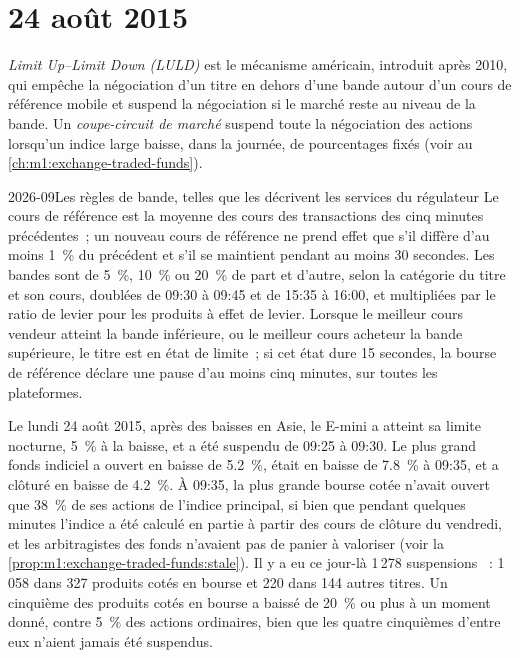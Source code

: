 \section{24 août 2015}

\begin{definition}\label{def:m1:stress-case-studies:luld}
\emph{Limit Up--Limit Down (LULD)} est le mécanisme américain,
introduit après 2010, qui empêche la négociation d'un titre en dehors d'une bande
autour d'un cours de référence mobile et suspend la négociation si le marché reste
au niveau de la bande. Un \emph{coupe-circuit de marché}
suspend toute la négociation des actions lorsqu'un indice large baisse, dans la
journée, de pourcentages fixés (voir au \cref{ch:m1:exchange-traded-funds}).
\end{definition}

\begin{dated}{2026-09}{Les règles de bande, telles que les décrivent les services du régulateur}\label{dat:m1:stress-case-studies:luld}
Le cours de référence est la moyenne des cours des transactions des cinq minutes
précédentes~; un nouveau cours de référence ne prend effet que s'il diffère d'au moins 1~\% du
précédent et s'il se maintient pendant au moins 30 secondes. Les bandes sont de 5~\%, 10~\% ou 20~\% de part et d'autre,
selon la catégorie du titre et son cours, doublées de 09:30 à 09:45 et de 15:35 à
16:00, et multipliées par le ratio de levier pour les produits à effet de levier. Lorsque le
meilleur cours vendeur atteint la bande inférieure, ou le meilleur cours acheteur la bande supérieure, le titre est
en état de limite~; si cet état dure 15 secondes, la bourse de référence déclare une
pause d'au moins cinq minutes, sur toutes les plateformes.
\end{dated}

Le lundi 24 août 2015, après des baisses en Asie, le E-mini a atteint sa
limite nocturne, 5~\% à la baisse, et a été suspendu de 09:25 à 09:30. Le plus grand
fonds indiciel a ouvert en baisse de 5.2~\%, était en baisse de 7.8~\% à 09:35, et a clôturé en baisse de 4.2~\%.
À 09:35, la plus grande bourse cotée n'avait ouvert que 38~\% de ses actions de l'indice
principal, si bien que pendant quelques minutes l'indice a été calculé en partie à partir
des cours de clôture du vendredi, et les arbitragistes des fonds n'avaient
pas de panier à valoriser (voir la \cref{prop:m1:exchange-traded-funds:stale}).
Il y a eu ce jour-là 1\,278 suspensions ~: 1\,058 dans 327 produits
cotés en bourse et 220 dans 144 autres titres. Un cinquième des produits cotés en
bourse a baissé de 20~\% ou plus à un moment donné, contre 5~\% des actions ordinaires,
bien que les quatre cinquièmes d'entre eux n'aient jamais été suspendus.

